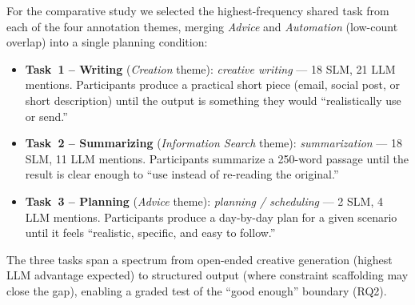 For the comparative study we selected the highest-frequency shared task from
each of the four annotation themes, merging \textit{Advice} and
\textit{Automation} (low-count overlap) into a single planning condition:

\begin{itemize}
  \item \textbf{Task~1 -- Writing} (\textit{Creation} theme):
    \textit{creative writing} --- 18 SLM, 21 LLM mentions.
    Participants produce a practical short piece (email, social post, or
    short description) until the output is something they would ``realistically
    use or send.''
  \item \textbf{Task~2 -- Summarizing} (\textit{Information Search} theme):
    \textit{summarization} --- 18 SLM, 11 LLM mentions.
    Participants summarize a 250-word passage until the result is clear enough
    to ``use instead of re-reading the original.''
  \item \textbf{Task~3 -- Planning} (\textit{Advice} theme):
    \textit{planning / scheduling} --- 2 SLM, 4 LLM mentions.
    Participants produce a day-by-day plan for a given scenario until it feels
    ``realistic, specific, and easy to follow.''
\end{itemize}

The three tasks span a spectrum from open-ended creative generation (highest
LLM advantage expected) to structured output (where constraint scaffolding
may close the gap), enabling a graded test of the ``good enough'' boundary
(RQ2).
